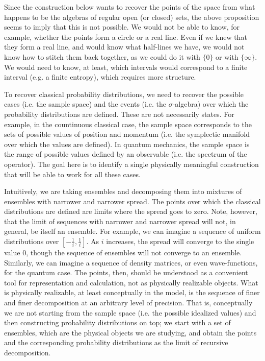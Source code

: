 \begin{remark}
	Since the construction below wants to recover the points of the space from what happens to be the algebras of regular open (or closed) sets, the above proposition seems to imply that this is not possible. We would not be able to know, for example, whether the points form a circle or a real line. Even if we knew that they form a real line, and would know what half-lines we have, we would not know how to stitch them back together, as we could do it with $\{0\}$ or with $\{\infty\}$. We would need to know, at least, which intervals would correspond to a finite interval (e.g. a finite entropy), which requires more structure.
\end{remark}

To recover classical probability distributions, we need to recover the possible cases (i.e. the sample space) and the events (i.e. the $\sigma$-algebra) over which the probability distributions are defined. These are not necessarily states. For example, in the countinuous classical case, the sample space corresponds to the sets of possible values of position and momentum (i.e. the symplectic manifold over which the values are defined). In quantum mechanics, the sample space is the range of possible values defined by an observable (i.e. the spectrum of the operator). The goal here is to identify a single physically meaningful construction that will be able to work for all these cases.

Intuitively, we are taking ensembles and decomposing them into mixtures of ensembles with narrower and narrower spread. The points over which the classical distributions are defined are limits where the spread goes to zero. Note, however, that the limit of sequences with narrower and narrower spread will not, in general, be itself an ensemble. For example, we can imagine a sequence of uniform distributions over $[-\frac{1}{i}, \frac{1}{i}]$. As $i$ increases, the spread will converge to the single value $0$, though the sequence of ensembles will not converge to an ensemble. Similarly, we can imagine a sequence of density matrices, or even wave-functions, for the quantum case. The points, then, should be understood as a convenient tool for representation and calculation, not as physically realizable objects. What is physically realizable, at least conceptually in the model, is the sequence of finer and finer decomposition at an arbitrary level of precision. That is, conceptually we are not starting from the sample space (i.e. the possible idealized values) and then constructing probability distributions on top; we start with a set of ensembles, which are the physical objects we are studying, and obtain the points and the corresponding probability distributions as the limit of recursive decomposition.

